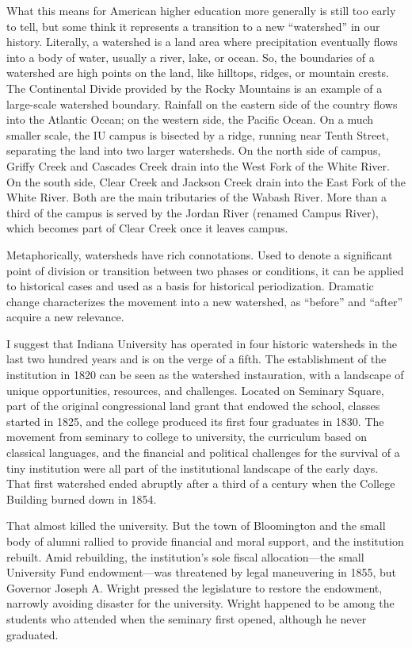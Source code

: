 \documentclass[
  american,
  letterpaper,
]{scrreprt}
\begin{document}
What this means for American higher education more generally is still
too early to tell, but some think it represents a transition to a new
``watershed'' in our history. Literally, a watershed is a land area
where precipitation eventually flows into a body of water, usually a
river, lake, or ocean. So, the boundaries of a watershed are high points
on the land, like hilltops, ridges, or mountain crests. The Continental
Divide provided by the Rocky Mountains is an example of a large-scale
watershed boundary. Rainfall on the eastern side of the country flows
into the Atlantic Ocean; on the western side, the Pacific Ocean. On a
much smaller scale, the IU campus is bisected by a ridge, running near
Tenth Street, separating the land into two larger watersheds. On the
north side of campus, Griffy Creek and Cascades Creek drain into the
West Fork of the White River. On the south side, Clear Creek and Jackson
Creek drain into the East Fork of the White River. Both are the main
tributaries of the Wabash River. More than a third of the campus is
served by the Jordan River (renamed Campus River), which becomes part of
Clear Creek once it leaves campus.

Metaphorically, watersheds have rich connotations. Used to denote a
significant point of division or transition between two phases or
conditions, it can be applied to historical cases and used as a basis
for historical periodization. Dramatic change characterizes the movement
into a new watershed, as ``before'' and ``after'' acquire a new
relevance.

I suggest that Indiana University has operated in four historic
watersheds in the last two hundred years and is on the verge of a fifth.
The establishment of the institution in 1820 can be seen as the
watershed instauration, with a landscape of unique opportunities,
resources, and challenges. Located on Seminary Square, part of the
original congressional land grant that endowed the school, classes
started in 1825, and the college produced its first four graduates in
1830. The movement from seminary to college to university, the
curriculum based on classical languages, and the financial and political
challenges for the survival of a tiny institution were all part of the
institutional landscape of the early days. That first watershed ended
abruptly after a third of a century when the College Building burned
down in 1854.

That almost killed the university. But the town of Bloomington and the
small body of alumni rallied to provide financial and moral support, and
the institution rebuilt. Amid rebuilding, the institution's sole fiscal
allocation---the small University Fund endowment---was threatened by
legal maneuvering in 1855, but Governor Joseph A. Wright pressed the
legislature to restore the endowment, narrowly avoiding disaster for the
university. Wright happened to be among the students who attended when
the seminary first opened, although he never graduated.
\end{document}
